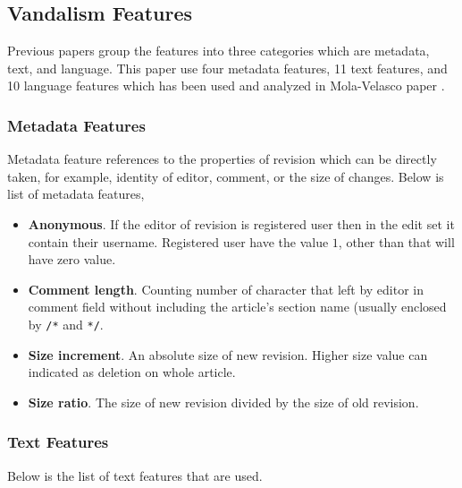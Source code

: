 \documentclass[conference,compsoc,a4paper,twocolumn,final]{IEEEtran}
\begin{document}

\subsection{Vandalism Features}

Previous papers group the features into three categories which are metadata,
text, and language.
This paper use four metadata features, 11 text features, and 10
language features which has been used and analyzed in Mola-Velasco paper
\cite{mola2012wikipedia}.

\subsubsection{Metadata Features}

Metadata feature references to the properties of revision which can be directly
taken, for example, identity of editor, comment, or the size of changes.
Below is list of metadata features,
\begin{itemize}
\item \textbf{Anonymous}. If the editor of revision is registered user then in
the edit set it contain their username. Registered user have the
value $1$, other than that will have zero value.
\item \textbf{Comment length}. Counting number of character that left by editor
in comment field without including the article's section name (usually enclosed
by \texttt{/*} and \texttt{*/}.
\item \textbf{Size increment}. An absolute size of new revision. Higher size
value can indicated as deletion on whole article.
\item \textbf{Size ratio}. The size of new revision divided by the size of old
revision.
\end{itemize}

\subsubsection{Text Features}

Below is the list of text features that are used.
\end{document}
